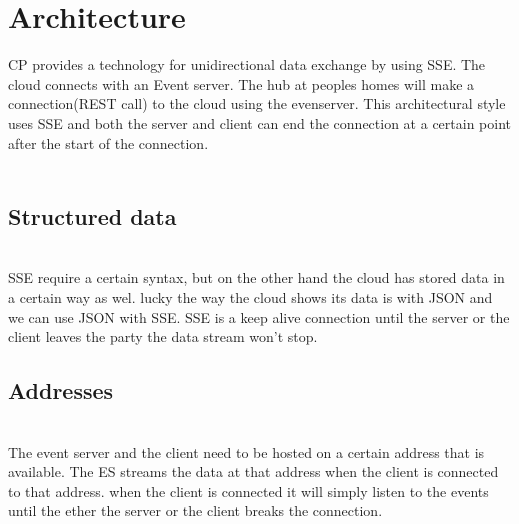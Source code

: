 \documentclass{article}
\begin{document}
\section{Architecture}\label{sec:architecture}
CP provides a technology for unidirectional data exchange by using SSE. The cloud connects with an Event server. The hub at peoples homes will make a connection(REST call) to the cloud using the evenserver. This architectural style uses SSE and both the server and client can end the connection at a certain point after the start of the connection. \\
\\

\subsection{Structured data}\label{sec:strucdata} \\
SSE require a certain syntax, but on the other hand the cloud has stored data in a certain way as wel. lucky the way the cloud shows its data is with JSON and we can use JSON with SSE. SSE is a keep alive connection until the server or the client leaves the party the data stream won't stop.\\

\subsection{Addresses}\label{sec:addresses} \\
The event server and the client need to be hosted on a certain address that is available. The ES streams the data at that address when the client is connected to that address. when the client is connected it will simply listen to the events until the ether the server or the client breaks the connection. \\

\cleardoublepage
\end{document}
